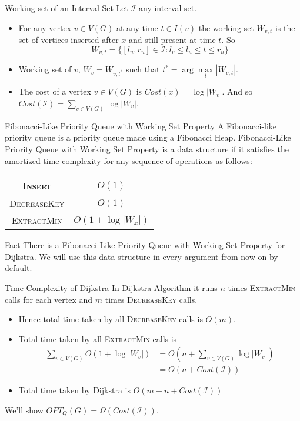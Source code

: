\documentclass[10pt]{beamer}
\begin{document}
\begin{frame}{Working set of an Interval Set}
	Let $\mathcal{I}$ any interval set.\pause 

	\begin{itemize}
		\item For any vertex $v\in V(G)$ at any time $t\in I(v)$ the working set $W_{v,t}$ is the set of vertices inserted after $x$ and still present at time $t$. So $$W_{v,t}=\{[l_u,r_u]\in\mathcal{I}\colon l_v\leq l_u\leq t\leq r_u\}$$\pause \vfill
		\item Working set of $v$, $W_v=W_{v,t^*}$ such that $t^*=\arg\max\limits_t|W_{v,t}|$.\pause  \vfill
		\item The cost of a vertex $v\in V(G)$ is $Cost(x)=\log|W_v|$. And so $Cost(\mathcal{I})=\sum\limits_{v\in V(G)} \log |W_v|$.
	\end{itemize}
\end{frame}
\begin{frame}{Fibonacci-Like Priority Queue with Working Set Property}
	A Fibonacci-like priority queue is a priority queue made using a Fibonacci Heap. Fibonacci-Like Priority Queue with Working Set Property is a data structure if it satisfies the amortized time complexity for any sequence of operations as follows:\pause 

	\begin{center}
		\begin{tabular}{|c|c|}
			\hline
			\textsc{Insert}      & $O(1)$           \\  \hline
			\textsc{DecreaseKey} & $O(1)$           \\ \hline
			\textsc{ExtractMin}  & $O(1+\log|W_x|)$ \\ \hline
		\end{tabular}
	\end{center}\pause \vfill


	\begin{alertblock}{Fact}
		There is a Fibonacci-Like Priority Queue with Working Set Property for Dijkstra. We will use this data structure in every argument from now on by default.
	\end{alertblock}
\end{frame}
\begin{frame}{Time Complexity of Dijkstra}
	In Dijkstra Algorithm it runs $n$ times \textsc{ExtractMin} calls for each vertex and $m$ times \textsc{DecreaseKey} calls.\pause 
	\begin{itemize}
		\item Hence total time taken by all \textsc{DecreaseKey} calls is $O(m)$.\pause 
		\item Total time taken by all \textsc{ExtractMin} calls is \begin{align*}
			      \sum\limits_{v\in V(G)}O(1+\log|W_v|) & = O\left(n+\sum\limits_{v\in V(G)} \log |W_v| \right) \\
			                                            & = O(n+Cost(\mathcal{I}))
		      \end{align*}
		\item Total time taken by Dijkstra is $O(m+n+Cost(\mathcal{I}))$
	\end{itemize}\pause 
  We'll show $OPT_Q(G)=\Omega(Cost(\mathcal{I}))$.  
\end{frame}
\end{document}

